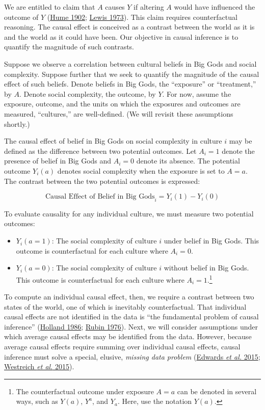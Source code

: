 \documentclass[
  singlecolumn]{article}
\providecommand{\tightlist}{%
  \setlength{\itemsep}{0pt}\setlength{\parskip}{0pt}}\usepackage{longtable,booktabs,array}
\begin{document}
We are entitled to claim that \(A\) causes \(Y\) if altering \(A\) would
have influenced the outcome of \(Y\)
(\protect\hyperlink{ref-hume1902}{Hume 1902};
\protect\hyperlink{ref-lewis1973}{Lewis 1973}). This claim requires
counterfactual reasoning. The causal effect is conceived as a contrast
between the world as it is and the world as it could have been. Our
objective in causal inference is to quantify the magnitude of such
contrasts.

Suppose we observe a correlation between cultural beliefs in Big Gods
and social complexity. Suppose further that we seek to quantify the
magnitude of the causal effect of such beliefs. Denote beliefs in Big
Gods, the ``exposure'' or ``treatment,'' by \(A\). Denote social
complexity, the outcome, by \(Y\). For now, assume the exposure,
outcome, and the units on which the exposures and outcomes are measured,
``cultures,'' are well-defined. (We will revisit these assumptions
shortly.)

The causal effect of belief in Big Gods on social complexity in culture
\(i\) may be defined as the difference between two potential outcomes.
Let \(A_i = 1\) denote the presence of belief in Big Gods and
\(A_i = 0\) denote its absence. The potential outcome \(Y_i(a)\) denotes
social complexity when the exposure is set to \(A = a\). The contrast
between the two potential outcomes is expressed:

\[
\text{Causal Effect of Belief in Big Gods}_i = Y_i(1) - Y_i(0) 
\]

To evaluate causality for any individual culture, we must measure two
potential outcomes:

\begin{itemize}
\tightlist
\item
  \(Y_i(a = 1)\): The social complexity of culture \(i\) under belief in
  Big Gods. This outcome is counterfactual for each culture where
  \(A_i = 0\).
\item
  \(Y_i(a = 0)\): The social complexity of culture \(i\) without belief
  in Big Gods. This outcome is counterfactual for each culture where
  \(A_i = 1\).\footnote{The counterfactual outcome under exposure
    \(A = a\) can be denoted in several ways, such as \(Y(a)\),
    \(Y^{a}\), and \(Y_a\). Here, use the notation \(Y(a)\).}
\end{itemize}

To compute an individual causal effect, then, we require a contrast
between two states of the world, one of which is inevitably
counterfactual. That individual causal effects are not identified in the
data is ``the fundamental problem of causal inference''
(\protect\hyperlink{ref-holland1986}{Holland 1986};
\protect\hyperlink{ref-rubin1976}{Rubin 1976}). Next, we will consider
assumptions under which average causal effects may be identified from
the data. However, because average causal effects require summing over
individual causal effects, causal inference must solve a special,
elusive, \emph{missing data problem}
(\protect\hyperlink{ref-edwards2015}{Edwards \emph{et al.} 2015};
\protect\hyperlink{ref-westreich2015}{Westreich \emph{et al.} 2015}).
\end{document}
